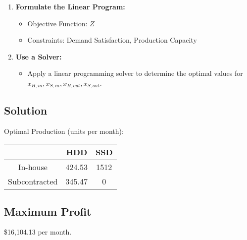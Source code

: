 \documentclass[12pt]{article}
\begin{document}
\begin{enumerate}
    \item \textbf{Formulate the Linear Program:}
    \begin{itemize}
        \item Objective Function: \( Z \)
        \item Constraints: Demand Satisfaction, Production Capacity
    \end{itemize}
    
    \item \textbf{Use a Solver:}
    \begin{itemize}
        \item Apply a linear programming solver to determine the optimal values for \( x_{H,in}, x_{S,in}, x_{H,out}, x_{S,out} \).
    \end{itemize}
\end{enumerate}

\subsection*{Solution}
Optimal Production (units per month):

\begin{tabular}{|c|c|c|}
\hline
 & HDD & SSD \\
\hline
In-house & 424.53 & 1512 \\
Subcontracted & 345.47 & 0 \\
\hline
\end{tabular}

\subsection*{Maximum Profit}
\$16,104.13 per month.

\vspace{290pt}
\end{document}
